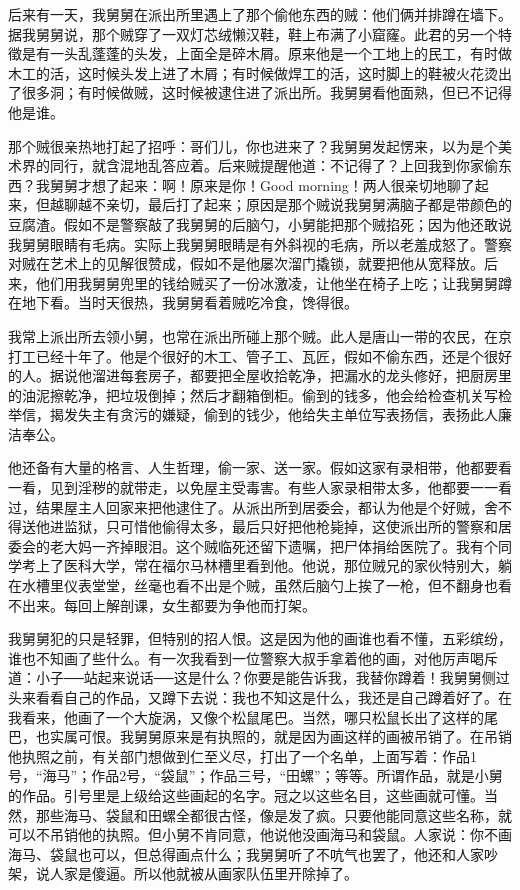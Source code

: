 后来有一天，我舅舅在派出所里遇上了那个偷他东西的贼：他们俩并排蹲在墙下。据我舅舅说，那个贼穿了一双灯芯绒懒汉鞋，鞋上布满了小窟窿。此君的另一个特徵是有一头乱蓬蓬的头发，上面全是碎木屑。原来他是一个工地上的民工，有时做木工的活，这时候头发上进了木屑；有时候做焊工的活，这时脚上的鞋被火花烫出了很多洞；有时候做贼，这时候被逮住进了派出所。我舅舅看他面熟，但已不记得他是谁。 

那个贼很亲热地打起了招呼：哥们儿，你也进来了？我舅舅发起愣来，以为是个美术界的同行，就含混地乱答应着。后来贼提醒他道：不记得了？上回我到你家偷东西？我舅舅才想了起来：啊！原来是你！Good morning！两人很亲切地聊了起来，但越聊越不亲切，最后打了起来；原因是那个贼说我舅舅满脑子都是带颜色的豆腐渣。假如不是警察敲了我舅舅的后脑勺，小舅能把那个贼掐死；因为他还敢说我舅舅眼睛有毛病。实际上我舅舅眼睛是有外斜视的毛病，所以老羞成怒了。警察对贼在艺术上的见解很赞成，假如不是他屡次溜门撬锁，就要把他从宽释放。后来，他们用我舅舅兜里的钱给贼买了一份冰激凌，让他坐在椅子上吃；让我舅舅蹲在地下看。当时天很热，我舅舅看着贼吃冷食，馋得很。 

我常上派出所去领小舅，也常在派出所碰上那个贼。此人是唐山一带的农民，在京打工已经十年了。他是个很好的木工、管子工、瓦匠，假如不偷东西，还是个很好的人。据说他溜进每套房子，都要把全屋收拾乾净，把漏水的龙头修好，把厨房里的油泥擦乾净，把垃圾倒掉；然后才翻箱倒柜。偷到的钱多，他会给检查机关写检举信，揭发失主有贪污的嫌疑，偷到的钱少，他给失主单位写表扬信，表扬此人廉洁奉公。 

他还备有大量的格言、人生哲理，偷一家、送一家。假如这家有录相带，他都要看一看，见到淫秽的就带走，以免屋主受毒害。有些人家录相带太多，他都要一一看过，结果屋主人回家来把他逮住了。从派出所到居委会，都认为他是个好贼，舍不得送他进监狱，只可惜他偷得太多，最后只好把他枪毙掉，这使派出所的警察和居委会的老大妈一齐掉眼泪。这个贼临死还留下遗嘱，把尸体捐给医院了。我有个同学考上了医科大学，常在福尔马林槽里看到他。他说，那位贼兄的家伙特别大，躺在水槽里仪表堂堂，丝毫也看不出是个贼，虽然后脑勺上挨了一枪，但不翻身也看不出来。每回上解剖课，女生都要为争他而打架。 

我舅舅犯的只是轻罪，但特别的招人恨。这是因为他的画谁也看不懂，五彩缤纷，谁也不知画了些什么。有一次我看到一位警察大叔手拿着他的画，对他厉声喝斥道：小子──站起来说话──这是什么？你要是能告诉我，我替你蹲着！我舅舅侧过头来看看自己的作品，又蹲下去说：我也不知这是什么，我还是自己蹲着好了。在我看来，他画了一个大旋涡，又像个松鼠尾巴。当然，哪只松鼠长出了这样的尾巴，也实属可恨。我舅舅原来是有执照的，就是因为画这样的画被吊销了。在吊销他执照之前，有关部门想做到仁至义尽，打出了一个名单，上面写着：作品1号，“海马”；作品2号，“袋鼠”；作品三号，“田螺”；等等。所谓作品，就是小舅的作品。引号里是上级给这些画起的名字。冠之以这些名目，这些画就可懂。当然，那些海马、袋鼠和田螺全都很古怪，像是发了疯。只要他能同意这些名称，就可以不吊销他的执照。但小舅不肯同意，他说他没画海马和袋鼠。人家说：你不画海马、袋鼠也可以，但总得画点什么；我舅舅听了不吭气也罢了，他还和人家吵架，说人家是傻逼。所以他就被从画家队伍里开除掉了。 

